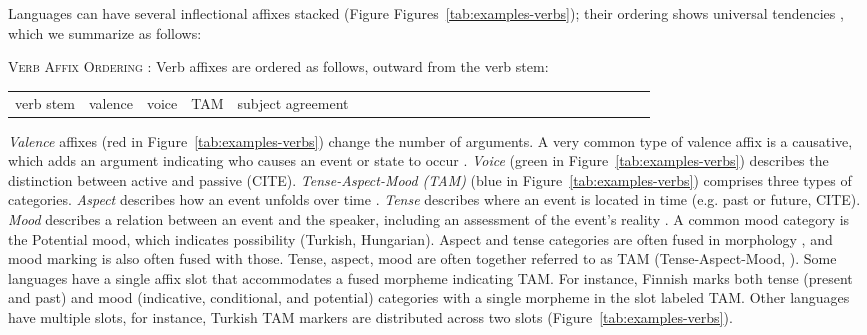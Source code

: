 \documentclass[11pt,letterpaper]{article}
\newcommand{\citep}{\parencite}
\begin{document}
Languages can have several inflectional affixes stacked (Figure Figures~\ref{tab:examples-verbs}); their ordering shows universal tendencies \citep{bybee-morphology-1985}, which we summarize as follows:

\begin{adjustwidth}{6em}{6em}
\textsc{Verb Affix Ordering} \citep{bybee-morphology-1985}:
Verb affixes are ordered as follows, outward from the verb stem:

\begin{tabular}{llllllllllllllllllllllllll}
verb stem & valence & voice & TAM & subject agreement
\end{tabular}
\end{adjustwidth}

\textit{Valence} affixes (red in Figure~\ref{tab:examples-verbs}) change the number of arguments. A very common type of valence affix is a causative, which adds an argument indicating who causes an event or state to occur \citep{wals-111}.
\textit{Voice} (green in Figure~\ref{tab:examples-verbs}) describes the distinction between active and passive (CITE). %
\textit{Tense-Aspect-Mood (TAM)} (blue in Figure~\ref{tab:examples-verbs}) comprises three types of categories.
\textit{Aspect} describes how an event unfolds over time \citep{comrie1976aspect,dahl1985tense,binnick1991time}.
\textit{Tense} describes where an event is located in time (e.g. past or future, CITE).
\textit{Mood} describes a relation between an event and the speaker, including an assessment of the event's reality \cite{palmer1986mood,portner2018mood}.
A common mood category is the Potential mood, which indicates possibility (Turkish, Hungarian).
Aspect and tense categories are often fused in morphology \citep{binnick2012the}, and mood marking is also often fused with those. %
Tense, aspect, mood are often together referred to as TAM (Tense-Aspect-Mood, \citep{bybee1994the, wals-69}).
Some languages have a single affix slot that accommodates a fused morpheme indicating TAM.
For instance, Finnish marks both tense (present and past) and mood (indicative, conditional, and potential) categories with a single morpheme in the slot labeled TAM.
Other languages have multiple slots, for instance, Turkish TAM markers are distributed across two slots (Figure~\ref{tab:examples-verbs}).
\end{document}
